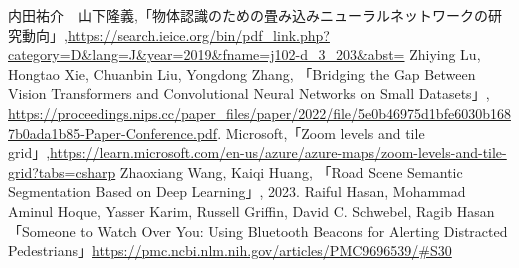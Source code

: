 \documentclass[uplatex,dvipdfmx]{jsarticle}
\begin{document}
\begin{thebibliography}{16}
 内田祐介　山下隆義,「物体認識のための畳み込みニューラルネットワークの研究動向」,\url{https://search.ieice.org/bin/pdf_link.php?category=D&lang=J&year=2019&fname=j102-d_3_203&abst=}
 Zhiying Lu, Hongtao Xie, Chuanbin Liu, Yongdong Zhang, 「Bridging the Gap Between Vision Transformers and
Convolutional Neural Networks on Small Datasets」, \url{https://proceedings.nips.cc/paper_files/paper/2022/file/5e0b46975d1bfe6030b1687b0ada1b85-Paper-Conference.pdf}.
Microsoft,「Zoom levels and tile grid」,\url{https://learn.microsoft.com/en-us/azure/azure-maps/zoom-levels-and-tile-grid?tabs=csharp}
Zhaoxiang Wang, Kaiqi Huang, 「Road Scene Semantic Segmentation Based on Deep Learning」, 2023.
Raiful Hasan, Mohammad Aminul Hoque, Yasser Karim, Russell Griffin, David C. Schwebel, Ragib Hasan「Someone to Watch Over You: Using Bluetooth Beacons for Alerting Distracted Pedestrians」\url{https://pmc.ncbi.nlm.nih.gov/articles/PMC9696539/#S30}
\end{thebibliography}
\end{document}
